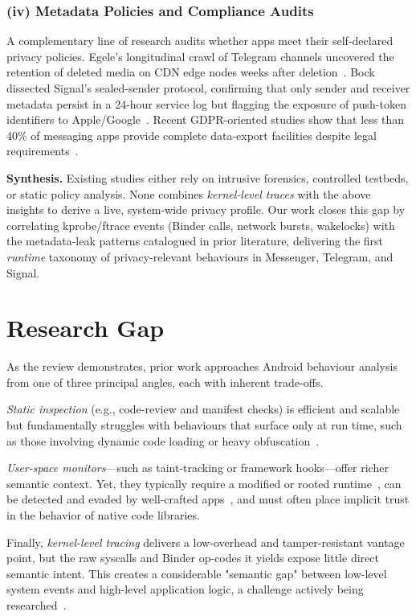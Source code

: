 \documentclass[a4paper,12pt]{report}
\begin{document}
\subsubsection*{(iv) Metadata Policies and Compliance Audits}
A complementary line of research audits whether apps meet their self-declared privacy policies. Egele’s longitudinal crawl of Telegram channels uncovered the retention of deleted media on CDN edge nodes weeks after deletion~\cite{egele2019cdn}. Bock dissected Signal’s sealed-sender protocol, confirming that only sender and receiver metadata persist in a 24-hour service log but flagging the exposure of push-token identifiers to Apple/Google~\cite{bock2020sealed}. Recent GDPR-oriented studies show that less than 40\% of messaging apps provide complete data-export facilities despite legal requirements~\cite{frolov2022gdpr}.

\medskip
\noindent\textbf{Synthesis.}
Existing studies either rely on intrusive forensics, controlled testbeds, or static policy analysis. None combines \emph{kernel-level traces} with the above insights to derive a live, system-wide privacy profile. Our work closes this gap by correlating kprobe/ftrace events (Binder calls, network bursts, wakelocks) with the metadata-leak patterns catalogued in prior literature, delivering the first \emph{runtime} taxonomy of privacy-relevant behaviours in Messenger, Telegram, and Signal.

\section{Research Gap}
\label{sec:rw:gap}

As the review demonstrates, prior work approaches Android behaviour analysis from one of three principal angles, each with inherent trade-offs.

\emph{Static inspection} (e.g., code-review and manifest checks) is efficient and scalable but fundamentally struggles with behaviours that surface only at run time, such as those involving dynamic code loading or heavy obfuscation~\cite{li2016droidra, feng2020survey}.

\emph{User-space monitors}—such as taint-tracking or framework hooks—offer richer semantic context. Yet, they typically require a modified or rooted runtime~\cite{xposed, enck2014taintdroid}, can be detected and evaded by well-crafted apps~\cite{inviseal2023}, and must often place implicit trust in the behavior of native code libraries.

Finally, \emph{kernel-level tracing} delivers a low-overhead and tamper-resistant vantage point, but the raw syscalls and Binder op-codes it yields expose little direct semantic intent. This creates a considerable "semantic gap" between low-level system events and high-level application logic, a challenge actively being researched~\cite{nisi2019syscall}.
\end{document}
